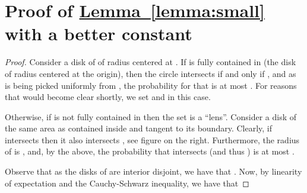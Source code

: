 \documentclass[12pt]{article}
\theoremstyle{remark}\theoremheaderfont{\sf}\theorembodyfont{\upshape}\newtheorem{defn}[theorem]{Definition}
\newcommand{\HLink}[2]{\hyperref[#2]{#1~\ref*{#2}}}
\newcommand{\apndlab}[1]{\label{apnd:#1}}
\newcommand{\lemref}[1]{\HLink{Lemma}{lemma:#1}}
\begin{document}
\appendix

\section{Proof of \lemref{small} with a better constant}
\apndlab{better:c}


\begin{proof}
    Consider a disk  of  of radius  centered at
    .  If  is fully contained in  (the
    disk of radius  centered at the origin), then the circle 
    intersects  if and only if , and as  is being picked uniformly from
    , the probability for that is at most . For reasons that would become clear shortly, we set  and  in this case.

    \vspace{-0.3cm}
    \vspace{0.3cm}

    Otherwise, if  is not fully contained in  then
    the set  is a ``lens''. Consider a
    disk  of the same area as  contained inside
     and tangent to its boundary. Clearly, if 
    intersects  then it also intersects , see
    figure on the right. Furthermore, the radius of  is
    , and, by
    the above, the probability that  intersects  (and
    thus ) is at most .

    Observe that as the disks of  are interior disjoint, we
    have that .  Now, by
    linearity of expectation and the Cauchy-Schwarz inequality, we
    have that
    
\end{proof}
\end{document}
